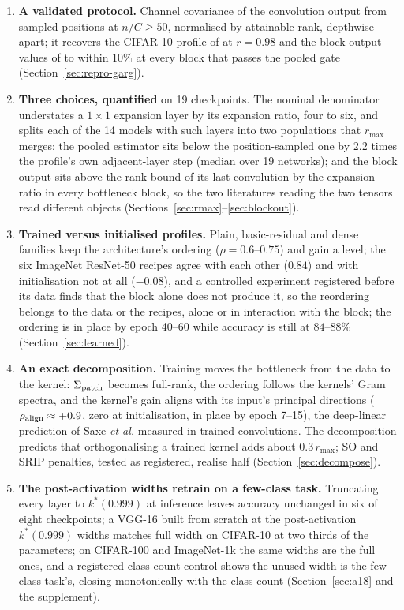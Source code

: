 \documentclass[10pt,journal,compsoc]{IEEEtran}
\begin{document}
\begin{enumerate}
  \item \textbf{A validated protocol.} Channel covariance of the
  convolution output from sampled positions at $n/C \ge 50$, normalised by
  attainable rank, depthwise apart; it recovers the CIFAR-10 profile of
  \cite{garg2019lowEffort} at $r = 0.98$ and the block-output values of
  \cite{elmoznino2024highDim} to within $10\%$ at every block that passes
  the pooled gate (Section~\ref{sec:repro-garg}).
  \item \textbf{Three choices, quantified} on 19 checkpoints. The nominal
  denominator understates a $1\!\times\!1$ expansion layer by its
  expansion ratio, four to six, and splits each of the 14 models with such
  layers into two populations that $r_{\max}$ merges; the pooled estimator
  sits below the position-sampled one by $2.2$ times the profile's own
  adjacent-layer step (median over 19 networks); and the block output sits
  above the rank bound of its last convolution by the expansion ratio in
  every bottleneck block, so the two literatures reading the two tensors
  read different objects (Sections~\ref{sec:rmax}--\ref{sec:blockout}).
  \item \textbf{Trained versus initialised profiles.} Plain,
  basic-residual and dense families keep the architecture's ordering
  ($\rho = 0.6$--$0.75$) and gain a level; the six ImageNet ResNet-50
  recipes agree with each other ($0.84$) and with initialisation not at all
  ($-0.08$), and a controlled experiment registered before its data finds
  that the block alone does not produce it, so the reordering belongs to
  the data or the recipes, alone or in interaction with the block; the
  ordering is in place by epoch 40--60 while accuracy is still at
  $84$--$88\%$ (Section~\ref{sec:learned}).
  \item \textbf{An exact decomposition.} Training moves the bottleneck
  from the data to the kernel: $\Sigma_{\rm patch}$ becomes full-rank, the
  ordering follows the kernels' Gram spectra, and the kernel's gain
  aligns with its input's principal directions ($\rho_{\rm align} \approx
  +0.9$, zero at initialisation, in place by epoch 7--15), the
  deep-linear prediction of Saxe \emph{et al.} measured in trained
  convolutions. The decomposition predicts that orthogonalising a
  trained kernel adds about $0.3\,r_{\max}$; SO and SRIP penalties, tested
  as registered, realise half (Section~\ref{sec:decompose}).
  \item \textbf{The post-activation widths retrain on a few-class task.}
  Truncating every
  layer to $k^*(0.999)$ at inference leaves accuracy unchanged in six of
  eight checkpoints; a VGG-16 built from scratch at the post-activation
  $k^*(0.999)$ widths matches full width on CIFAR-10 at two thirds of the
  parameters; on CIFAR-100 and ImageNet-1k the same widths are the full
  ones, and a registered class-count control shows the unused width is the
  few-class task's, closing monotonically with the class count
  (Section~\ref{sec:a18} and the supplement).
\end{enumerate}
\end{document}
